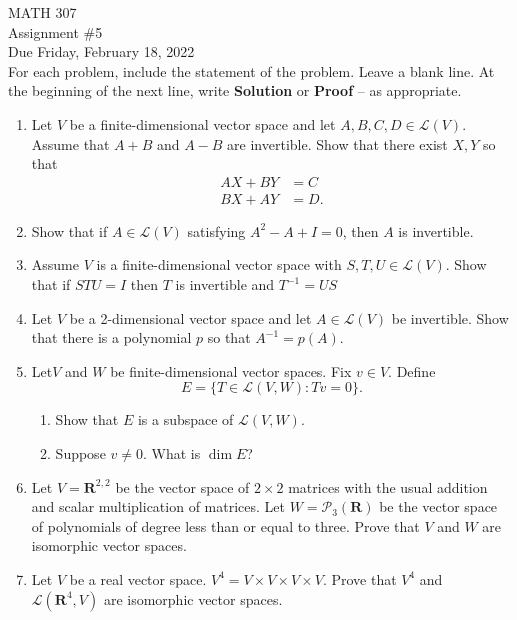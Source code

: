 \documentclass[12pt]{article}
\begin{document}
\noindent MATH 307 \\
Assignment \#5 \\  %
Due Friday, February 18, 2022 \\

For each problem, include the statement of the problem. Leave a blank line.  At the beginning of the next line, write \textbf{Solution} or \textbf{Proof} -- as appropriate.

\begin{enumerate}
\item Let $V$ be a finite-dimensional vector space and let $A,B,C,D \in \mathcal{L}(V)$.  Assume that $A+B$ and $A-B$ are invertible.  Show that there exist $X,Y$ so that
    \begin{align*}
    AX + BY &= C \\
    BX + AY &= D.
    \end{align*}

\item Show that if $A \in \mathcal{L}(V)$ satisfying $A^2 -A+I=0$, then $A$ is invertible.

\item Assume $V$ is a finite-dimensional vector space with $S,T,U \in \mathcal{L}(V)$.  Show that if $STU=I$ then $T$ is invertible and $T^{-1}= US$

\item Let $V$ be a 2-dimensional vector space and let $A \in \mathcal{L}(V)$ be invertible.  Show that there is a polynomial $p$ so that $A^{-1} = p(A)$.

\item Let$V$ and $W$ be finite-dimensional vector spaces. Fix $v \in V$. Define
    \[
        E = \{ T \in \mathcal{L}(V,W) : Tv=0 \}.
    \]
    \begin{enumerate}
    \item Show that $E$ is a subspace of $\mathcal{L}(V,W)$.
    \item Suppose $v \ne 0$.  What is $\dim E$?
    \end{enumerate}

\item  Let $V= \mathbf{R}^{2,2}$ be the vector space of $2 \times 2$ matrices with the usual addition and scalar multiplication of matrices.  Let $W = \mathcal{P}_3(\mathbf{R})$ be the vector space of polynomials of degree less than or equal to three.  Prove that $V$ and $W$ are isomorphic vector spaces.

\item Let $V$ be a real vector space.  $V^4 = V \times V \times V \times V$.  Prove that $V^4$ and $\mathcal{L}(\mathbf{R}^4, V)$ are isomorphic vector spaces.

\end{enumerate}
\end{document}
